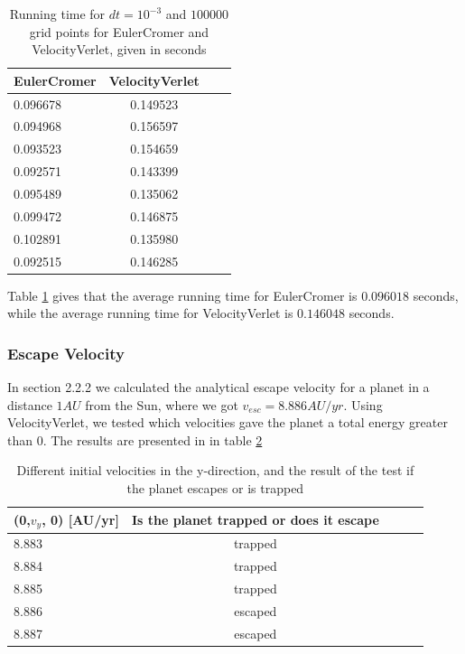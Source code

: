 \documentclass[norsk,a4paper,12pt]{article}
\begin{document}
{\begin{table} [H]
\centering
\caption{Running time for $dt=10^{-3}$ and $100000$ grid points for EulerCromer and VelocityVerlet, given in seconds}
\begin{tabularx}{\textwidth}{XccX} \toprule
    \bf EulerCromer & \bf VelocityVerlet \\ \hline
    0.096678 & 0.149523\\ \hline
    0.094968 & 0.156597\\ \hline
    0.093523 & 0.154659\\ \hline
    0.092571 & 0.143399\\ \hline
    0.095489 & 0.135062\\ \hline
    0.099472 & 0.146875\\ \hline
    0.102891 & 0.135980\\ \hline
    0.092515 & 0.146285\\ \bottomrule
\end{tabularx}
\label{timeTable}
\end{table}

Table \ref{timeTable} gives that the average running time for EulerCromer is $0.096018$ seconds, while the average running time for VelocityVerlet is $0.146048$ seconds.

\subsubsection{Escape Velocity}
In section 2.2.2 we calculated the analytical escape velocity for a planet in a distance $1 AU$ from the Sun, where we got $v_{esc} = 8.886 AU/yr$. Using VelocityVerlet, we tested which velocities gave the planet a total energy greater than 0. The results are presented in in table \ref{trappedTable}

\begin{table} [H]
\centering
\caption{Different initial velocities in the y-direction, and the result of the test if the planet escapes or is trapped}
\begin{tabularx}{\textwidth}{XcXcX} \toprule
    (0,$v_y$, 0) [AU/yr] & \bf Is the planet trapped or does it escape \\ \hline
    8.883 & trapped \\ \hline
    8.884 & trapped \\ \hline
    8.885 & trapped \\ \hline
    8.886 & escaped \\ \hline
    8.887 & escaped \\ \bottomrule
\end{tabularx}
\label{trappedTable}
\end{table}
}
\end{document}
